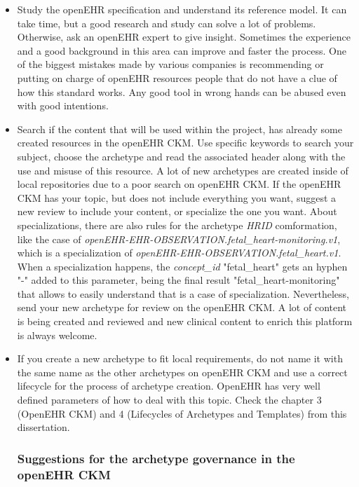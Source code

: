 \documentclass[mim_thesis.tex]{subfiles}
\begin{document}
\begin{itemize}
\item Study the openEHR specification and understand its reference model. It can take time, but a good research and study can solve a lot of problems. Otherwise, ask an openEHR expert to give insight. Sometimes the experience and a good background in this area can improve and faster the process. One of the biggest mistakes made by various companies is recommending or putting on charge of openEHR resources people that do not have a clue of how this standard works. Any good tool in wrong hands can be abused even with good intentions.

\item Search if the content that will be used within the project, has already some created resources in the openEHR CKM. Use specific keywords to search your subject, choose the archetype and read the associated header along with the use and misuse of this resource. A lot of new archetypes are created inside of local repositories due to a poor search on openEHR CKM. If the openEHR CKM has your topic, but does not include everything you want, suggest a new review to include your content, or specialize the one you want. About specializations, there are also rules for the archetype \textit{HRID} comformation, like the case of \textit{openEHR-EHR-OBSERVATION.fetal\_heart-monitoring.v1}, which is a specialization of \textit{openEHR-EHR-OBSERVATION.fetal\_heart.v1}. When a specialization happens, the \textit{concept\_id} "fetal\_heart" gets an hyphen "-" added to this parameter, being the final result "fetal\_heart-monitoring" that allows to easily understand that is a case of specialization. Nevertheless, send your new archetype for review on the openEHR CKM. A lot of content is being created and reviewed and new clinical content to enrich this platform is always welcome. 

\item If you create a new archetype to fit local requirements, do not name it with the same name as the other archetypes on openEHR CKM and use a correct lifecycle for the process of archetype creation. OpenEHR has very well defined parameters of how to deal with this topic. Check the chapter 3 (OpenEHR CKM) and 4 (Lifecycles of Archetypes and Templates) from this dissertation.  


\subsubsection{Suggestions for the archetype governance in the openEHR CKM}


\end{itemize}
\end{document}
